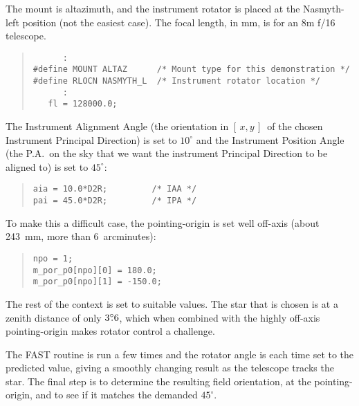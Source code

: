 \documentclass[12pt,fleqn,twoside]{article}
\renewcommand{\_}{{\tt\char'137}}     %
\newcommand{\xy}        {$[\,x,y\,]$}
\newcommand{\degree}[2] {$#1^{\circ}
                        \hspace{-0.35em}.\hspace{0.04em}#2$}
\begin{document}
The mount is altazimuth, and the instrument rotator is placed at the
Nasmyth-left position (not the easiest case).
The focal length, in mm, is for an 8m f/16
telescope.
\begin{quote}
\begin{small}
      \begin{verbatim}
      :
#define MOUNT ALTAZ      /* Mount type for this demonstration */
#define RLOCN NASMYTH_L  /* Instrument rotator location */
      :
   fl = 128000.0;
\end{verbatim}\end{small}
\end{quote}
The Instrument Alignment Angle (the orientation in \xy\ of the
chosen Instrument Principal Direction) is set to $10^\circ$ and
the Instrument Position Angle (the P.A.~on the sky that we
want the instrument Principal Direction to be aligned to) is
set to $45^\circ$:
\begin{quote}
\begin{small}
\begin{verbatim}
aia = 10.0*D2R;         /* IAA */
pai = 45.0*D2R;         /* IPA */
\end{verbatim}\end{small}
\end{quote}
To make this a difficult case, the pointing-origin is set well off-axis
(about 243~mm, more than 6~arcminutes):
\begin{quote}
\begin{small}
\begin{verbatim}
npo = 1;
m_por_p0[npo][0] = 180.0;
m_por_p0[npo][1] = -150.0;
\end{verbatim}\end{small}
\end{quote}
The rest of the context is set to suitable values.  The
star that is chosen is at a zenith distance of only
\degree{3}{6}, which when combined with the highly
off-axis pointing-origin makes rotator control a challenge.

The FAST routine is run a few times and the rotator angle is each
time set to the predicted value, giving a smoothly changing
result as the telescope tracks the star.  The
final step is to determine the resulting field orientation,
at the pointing-origin, and to see if it matches the demanded $45^\circ$.
\end{document}
